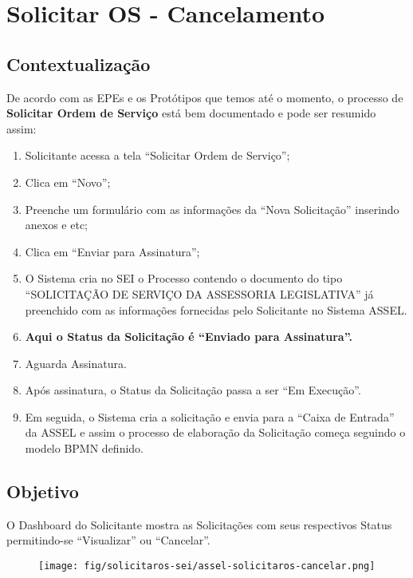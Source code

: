 \chapter{Solicitar OS - Cancelamento}

\section{Contextualização}

De acordo com as EPEs e os Protótipos que temos até o momento, o processo de \textbf{Solicitar Ordem de Serviço} está bem documentado e pode ser resumido assim:

\begin{enumerate}
	\item Solicitante acessa a tela ``Solicitar Ordem de Serviço'';
	\item Clica em ``Novo'';
	\item Preenche um formulário com as informações da ``Nova Solicitação'' inserindo anexos e etc;
	\item Clica em ``Enviar para Assinatura'';
	\item O Sistema cria no SEI o Processo contendo o documento do tipo “SOLICITAÇÃO DE SERVIÇO DA ASSESSORIA LEGISLATIVA” já preenchido com as informações fornecidas pelo Solicitante no Sistema ASSEL.
	\item \textbf{Aqui o Status da Solicitação é ``Enviado para Assinatura''.}
	\item Aguarda Assinatura.
	\item Após assinatura, o Status da Solicitação passa a ser ``Em Execução''.
	\item Em seguida, o Sistema cria a solicitação e envia para a ``Caixa de Entrada'' da ASSEL e assim o processo de elaboração da Solicitação começa seguindo o modelo BPMN definido.
\end{enumerate}

\section{Objetivo}

	O Dashboard do Solicitante mostra as Solicitações com seus respectivos Status permitindo-se ``Visualizar'' ou ``Cancelar''.

	\begin{figure}[htbp!]
	\centering
	\texttt{[image: fig/solicitaros-sei/assel-solicitaros-cancelar.png]}
	\end{figure}
	
